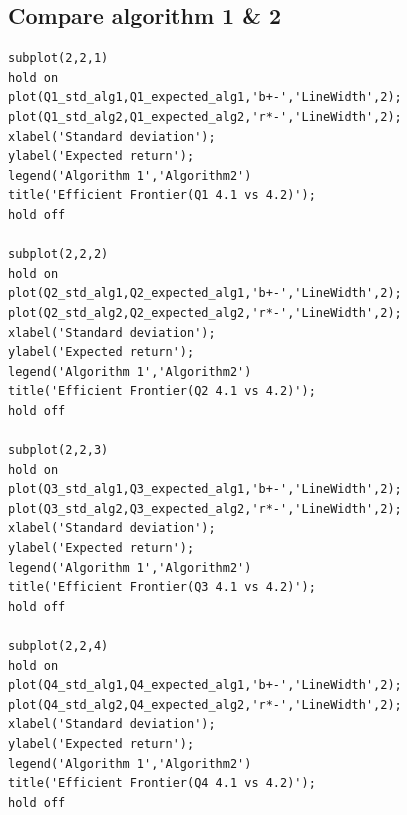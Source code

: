 \documentclass[11pt,a4paper]{article}
\begin{document}
\subsection*{Compare algorithm 1 \& 2}
\begin{lstlisting}
subplot(2,2,1)
hold on 
plot(Q1_std_alg1,Q1_expected_alg1,'b+-','LineWidth',2);
plot(Q1_std_alg2,Q1_expected_alg2,'r*-','LineWidth',2);
xlabel('Standard deviation');
ylabel('Expected return');
legend('Algorithm 1','Algorithm2')
title('Efficient Frontier(Q1 4.1 vs 4.2)');
hold off 

subplot(2,2,2)
hold on 
plot(Q2_std_alg1,Q2_expected_alg1,'b+-','LineWidth',2);
plot(Q2_std_alg2,Q2_expected_alg2,'r*-','LineWidth',2);
xlabel('Standard deviation');
ylabel('Expected return');
legend('Algorithm 1','Algorithm2')
title('Efficient Frontier(Q2 4.1 vs 4.2)');
hold off 

subplot(2,2,3)
hold on 
plot(Q3_std_alg1,Q3_expected_alg1,'b+-','LineWidth',2);
plot(Q3_std_alg2,Q3_expected_alg2,'r*-','LineWidth',2);
xlabel('Standard deviation');
ylabel('Expected return');
legend('Algorithm 1','Algorithm2')
title('Efficient Frontier(Q3 4.1 vs 4.2)');
hold off 

subplot(2,2,4)
hold on 
plot(Q4_std_alg1,Q4_expected_alg1,'b+-','LineWidth',2);
plot(Q4_std_alg2,Q4_expected_alg2,'r*-','LineWidth',2);
xlabel('Standard deviation');
ylabel('Expected return');
legend('Algorithm 1','Algorithm2')
title('Efficient Frontier(Q4 4.1 vs 4.2)');
hold off 
\end{lstlisting}
\end{document}
